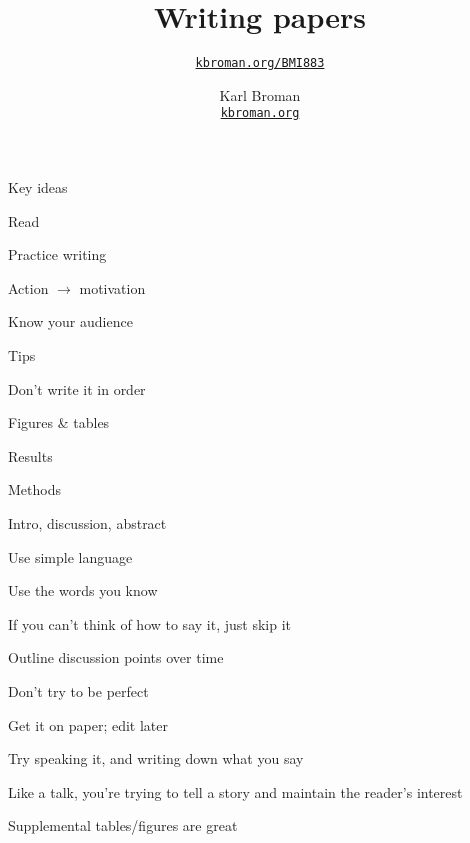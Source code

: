 \documentclass[aspectratio=169,12pt,t]{beamer}
\title{Writing papers}
\subtitle{}
\author{\href{https://kbroman.org/BMI883}{\tt kbroman.org/BMI883} }
\institute{}
\date{\small \hspace{3in} Karl Broman \\
  \hspace{3in} \href{https://kbroman.org}{\color{foreground}
    \small \tt kbroman.org}}
\begin{document}
{
\frame{
  \titlepage
} }



\begin{frame}{Key ideas}


  \bbi
\item Read
\item Practice writing
\item Action $\longrightarrow$ motivation
\item Know your audience
  \ei

\end{frame}




\begin{frame}{Tips}

      \bi
    \item Don't write it in order
      \bi
    \item Figures \& tables
    \item Results
    \item Methods
    \item Intro, discussion, abstract
      \ei
    \item Use simple language
      \bi
    \item Use the words you know
    \item If you can't think of how to say it, just skip it
      \ei
    \item Outline discussion points over time
    \item Don't try to be perfect
      \bi
    \item Get it on paper; edit later
      \ei
    \item Try speaking it, and writing down what you say
      \bi
      \item Like a talk, you're trying to tell a story and maintain
        the reader's interest
      \ei
    \item Supplemental tables/figures are great
    \ei


\end{frame}
\end{document}
